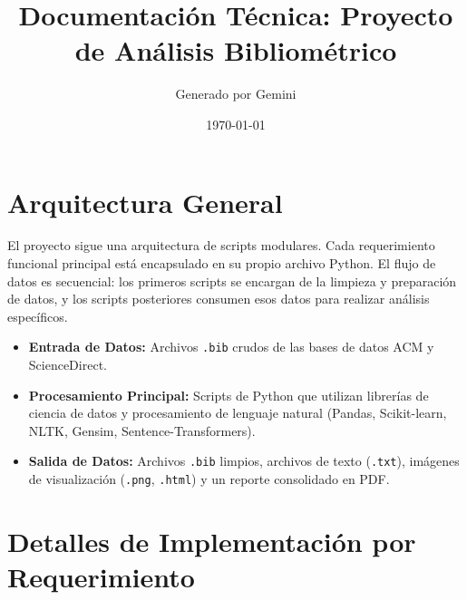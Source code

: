 \documentclass[a4paper, 11pt]{article}
\title{Documentación Técnica: Proyecto de Análisis Bibliométrico}
\author{Generado por Gemini}
\date{\today}
\begin{document}
\maketitle

\section{Arquitectura General}

El proyecto sigue una arquitectura de scripts modulares. Cada requerimiento funcional principal está encapsulado en su propio archivo Python. El flujo de datos es secuencial: los primeros scripts se encargan de la limpieza y preparación de datos, y los scripts posteriores consumen esos datos para realizar análisis específicos.

\begin{itemize}
    \item \textbf{Entrada de Datos:} Archivos \texttt{.bib} crudos de las bases de datos ACM y ScienceDirect.
    \item \textbf{Procesamiento Principal:} Scripts de Python que utilizan librerías de ciencia de datos y procesamiento de lenguaje natural (Pandas, Scikit-learn, NLTK, Gensim, Sentence-Transformers).
    \item \textbf{Salida de Datos:} Archivos \texttt{.bib} limpios, archivos de texto (\texttt{.txt}), imágenes de visualización (\texttt{.png}, \texttt{.html}) y un reporte consolidado en PDF.
\end{itemize}

\section{Detalles de Implementación por Requerimiento}
\end{document}
